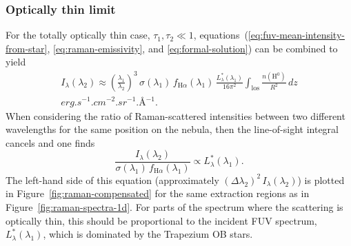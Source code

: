 \documentclass[useAMS, usenatbib, a4paper]{mnras}
\newcommand*\chem[1]{\ensuremath{\mathrm{#1}}}
\newcommand\ha{\ensuremath{\text{H}\alpha}}
\begin{document}
\subsubsection{Optically thin limit}
\label{sec:optically-thin-limit}

For the totally optically thin case, \(\tau_1, \tau_2 \ll 1\),
equations~(\ref{eq:fuv-mean-intensity-from-star},
\ref{eq:raman-emissivity},
and \ref{eq:formal-solution})
can be combined to yield
\begin{multline}
  \label{eq:optically-thin-intensity}
  I_\lambda (\lambda_2) \approx 
  \left(  \frac{\lambda_1}{\lambda_2}\right)^3 \, \sigma(\lambda_1) \, f_{\ha}(\lambda_1)
  \, \frac{L_\lambda^*(\lambda_1) } {16 \pi^2}
  \int_{\text{los}} \frac{n(\chem{H^0}) }{ R^2}  \, dz
  \\ \si{erg.s^{-1}.cm^{-2}.sr^{-1}.\angstrom^{-1}} .
\end{multline}
When considering the ratio of Raman-scattered intensities between two different wavelengths
for the same position on the nebula, then the line-of-sight integral cancels and one finds
\begin{equation}
  \label{eq:intensity-ratio-optically-thin}
  \frac{I_\lambda (\lambda_2)} {\sigma(\lambda_1) \, f_{\ha}(\lambda_1)} \propto L_\lambda^*(\lambda_1) .
\end{equation}
The left-hand side of this equation (approximately \((\Delta \lambda_2)^2\, I_\lambda (\lambda_2)\))
is plotted in Figure~\ref{fig:raman-compensated}
for the same extraction regions as in Figure~\ref{fig:raman-spectra-1d}. 
For parts of the spectrum where the scattering is optically thin,
this should be proportional to the incident FUV spectrum,
\(L_\lambda^*(\lambda_1)\),
which is dominated by the Trapezium OB stars. 
\end{document}

